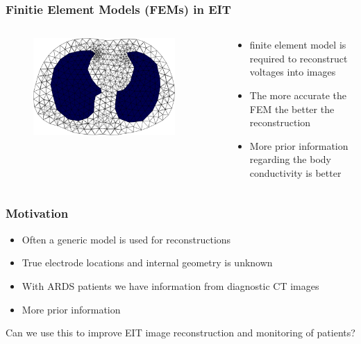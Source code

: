 \documentclass[10pt,    %
    english,            %
    xcolor=table,       %
    envcountsect,        %
    aspectratio=1610
]{beamer}
\begin{document}
\begin{frame}
	\frametitle{Finitie Element Models (FEMs) in EIT}    
	\begin{columns}[c]
		\begin{column}{0.5\textwidth}
			\begin{figure}[H]
				\centering
				\includegraphics[width=0.9\textwidth]{human_mesh_lungs.png}
			\end{figure}
		\end{column}
		\begin{column}{0.5\textwidth}
			\begin{itemize}
				\item finite element model is required to reconstruct voltages into images
				\item The more accurate the FEM the better the reconstruction
				\item \alert{More prior information regarding the body conductivity is better}
			\end{itemize}
		\end{column}
	\end{columns}
\end{frame}

\begin{frame}
	\frametitle{Motivation}    
	\begin{itemize}
		\item Often a generic model is used for reconstructions
		\item True electrode locations and internal geometry is unknown  
		\item With ARDS patients we have information from  diagnostic CT images
		\item More prior information 
	\end{itemize}
\vspace{2em}
\alert{Can we use this to improve EIT image reconstruction and monitoring of patients?}
\end{frame}
\end{document}

